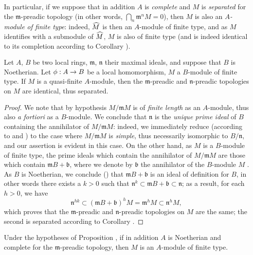 In particular, if we suppose that in addition $A$ is \emph{complete} and $M$ is
\emph{separated} for the $\mathfrak{m}$-preadic topology (in other words,
$\bigcap_n\mathfrak{m}^n M=0$), then $M$ is also an \emph{$A$-module of finite type}: indeed,
$\widehat{M}$ is then an $A$-module of finite type, and as $M$ identifies with a submodule of
$\widehat{M}$, $M$ is also of finite type (and is indeed identical to its completion
according to Corollary ).

\begin{proposition}[7.4.2]
\label{0.7.4.2}
Let $A$, $B$ be two local rings, $\mathfrak{m}$, $\mathfrak{n}$ their maximal ideals, and
suppose that $B$ is Noetherian. Let $\vphi:A\to B$ be a local homomorphism, $M$ a $B$-module
of finite type. If $M$ is a quasi-finite $A$-module, then the $\mathfrak{m}$-preadic and
$\mathfrak{n}$-preadic topologies on $M$ are identical, thus separated.
\end{proposition}

\begin{proof}
\label{proof-0.7.4.2}
We note that by hypothesis $M/\mathfrak{m}M$ is of \emph{finite length} as an $A$-module,
thus also \emph{a fortiori} as a $B$-module. We conclude that $\mathfrak{n}$ is the
\emph{unique prime ideal} of $B$ containing the annihilator of $M/\mathfrak{m}M$: indeed, we
immediately reduce (according to  and
) to the case where $M/\mathfrak{m}M$ is \emph{simple}, thus
necessarily isomorphic to $B/\mathfrak{n}$, and our assertion is evident in this case. On
the other hand, as $M$ is a $B$-module of finite type, the prime ideals which contain the
annihilator of $M/\mathfrak{m}M$ are those which contain $\mathfrak{m}B+\mathfrak{b}$, where
we denote by $\mathfrak{b}$ the annihilator of the $B$-module $M$
. As $B$ is Noetherian, we conclude
(\cite[p.~127, Cor.~4]{I-11}) that $\mathfrak{m}B+\mathfrak{b}$ is an ideal
of definition for $B$, in other words there exists a $k>0$ such that
$\mathfrak{n}^k\subset\mathfrak{m}B+\mathfrak{b}\subset\mathfrak{n}$; as a result, for each
$h>0$, we have
\[
  \mathfrak{n}^{hk}\subset(\mathfrak{m}B+\mathfrak{b})^h M
  =\mathfrak{m}^h M\subset\mathfrak{n}^h M,
\]
which proves that the $\mathfrak{m}$-preadic and $\mathfrak{n}$-preadic topologies on $M$
are the same; the second is separated according to Corollary .
\end{proof}

\begin{corollary}[7.4.3]
\label{0.7.4.3}
Under the hypotheses of Proposition , if in addition $A$ is
Noetherian and complete for the $\mathfrak{m}$-preadic topology, then $M$ is an $A$-module
of finite type.
\end{corollary}

